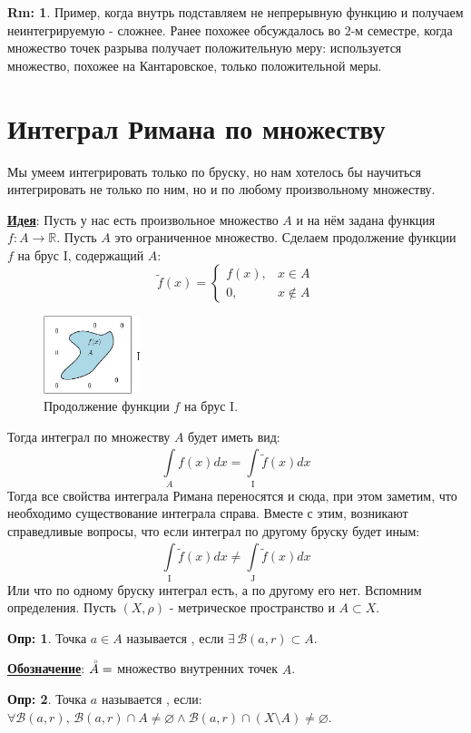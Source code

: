 \documentclass[12pt]{article}
\newcommand{\MR}{\mathbb{R}}
\newcommand{\MI}{\mathrm{I}}
\newcommand{\MJ}{\mathrm{J}}
\newcommand{\MB}{\mathcal{B}}
\newcommand{\VN}{\varnothing}
\theoremstyle{definition}
\newtheorem{defn}{Опр:}
\newtheorem{rem}{Rm:}
\newcommand{\ddint}[2]{\displaystyle\int\limits_{#1}^{#2}}
\newcommand{\wte}[1]{\widetilde{#1}}
\newcommand{\Circ}[1]{\accentset{\circ}{#1}}
\begin{document}
\begin{rem}
	Пример, когда внутрь подставляем не непрерывную функцию и получаем неинтегрируемую - сложнее. Ранее похожее обсуждалось во $2$-м семестре, когда множество точек разрыва получает положительную меру: используется множество, похожее на Кантаровское, только положительной меры.
\end{rem}

\section*{Интеграл Римана по множеству}
Мы умеем интегрировать только по бруску, но нам хотелось бы научиться интегрировать не только по ним, но и по любому произвольному множеству. 

\textbf{\uline{Идея}}: Пусть у нас есть произвольное множество $A$ и на нём задана функция $f\colon A \to \MR$.  Пусть $A$ это ограниченное множество. Сделаем продолжение функции $f$ на брус $\MI$, содержащий $A$:
$$
	\wte{f}(x) = 
	\begin{cases}
		f(x), & x \in A \\
		0, & x \not\in A
	\end{cases}
$$
\begin{figure}[H]
	\centering
	\includegraphics[width=0.25\textwidth]{MA4L4_1.eps}
	\caption{Продолжение функции $f$ на брус $\MI$.}
	\label{4_1}
\end{figure}
Тогда интеграл по множеству $A$ будет иметь вид:
$$
	\ddint{A}{}f(x)dx = \ddint{\MI}{}\wte{f}(x)dx
$$
Тогда все свойства интеграла Римана переносятся и сюда, при этом заметим, что необходимо существование интеграла справа. Вместе с этим, возникают справедливые вопросы, что если интеграл по другому бруску будет иным:
$$
	\ddint{\MI}{}\wte{f}(x)dx \neq \ddint{\MJ}{}\wte{f}(x)dx
$$ 
Или что по одному бруску интеграл есть, а по другому его нет. Вспомним определения. Пусть $(X, \rho)$ - метрическое пространство и $A \subset X$.
\begin{defn}
	Точка $a \in A$ называется , если $\exists \, \MB(a,r)\subset A$.
\end{defn}
\textbf{\uline{Обозначение}}: $\Circ{A} = $ множество внутренних точек $A$.
\begin{defn}
	Точка $a$ называется , если: $\forall \MB(a,r),\, \MB(a,r) \cap A \neq \VN \wedge \MB(a,r) \cap (X \setminus A) \neq \VN$.
\end{defn}
\end{document}
